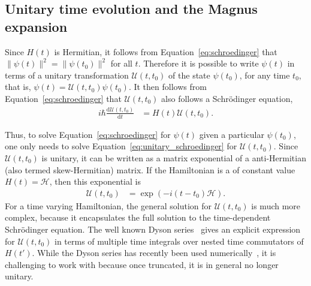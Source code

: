 \documentclass{jors}
\newcommand{\note}[1]{\textcolor{green}{\texttt{[NOTE: #1]}}}
\begin{document}
	\subsection{Unitary time evolution and the Magnus expansion}\label{sec:magnus}
		Since $H(t)$ is Hermitian, it follows from Equation~\eqref{eq:schroedinger} that $\|\psi(t)\|^2 = \|\psi(t_0)\|^2$ for all $t$.
		Therefore it is possible to write $ \psi(t) $ in terms of a unitary transformation $ \mathcal{U}(t, t_0) $ of the state $ \psi(t_0) $, for any time $ t_0 $, that is, $ \psi(t) = \mathcal{U}(t, t_0)\psi(t_0) $.
		It then follows from Equation~\eqref{eq:schroedinger} that $ \mathcal{U}(t, t_0) $ also follows a Schr\"{o}dinger equation,
		\begin{align}
			i\hbar\frac{\text{d}\mathcal{U}(t, t_0)}{\text{d}t} &= H(t)\mathcal{U}(t, t_0).\label{eq:unitary_schroedinger}
		\end{align}

		Thus, to solve Equation~\eqref{eq:schroedinger} for $ \psi(t) $ given a particular $ \psi(t_0) $, one only needs to solve Equation~\eqref{eq:unitary_schroedinger} for $ \mathcal{U}(t, t_0) $.
		Since $ \mathcal{U}(t, t_0) $ is unitary, it can be written as a matrix exponential of a anti-Hermitian (also termed skew-Hermitian) matrix.
		If the Hamiltonian is a of constant value $ H(t) = \mathcal{H} $, then this exponential is %
		\begin{align}
			\mathcal{U}(t, t_0) &= \exp(-i (t - t_0) \mathcal{H}).\label{eq:exp_sol_of_constant}
		\end{align}
		For a time varying Hamiltonian, the general solution for $ \mathcal{U}(t, t_0) $ is much more complex, because it encapsulates the full solution to the time-dependent Schr\"{o}dinger equation.
		The well known Dyson series~\cite{kalev_integral-free_2020} gives an explicit expression for $ \mathcal{U}(t, t_0) $ in terms of multiple time integrals over nested time commutators of $ H(t') $.
		While the Dyson series has recently been used numerically~\cite{kalev_integral-free_2020}, it is challenging to work with because once truncated, it is in general no longer unitary.
\end{document}
